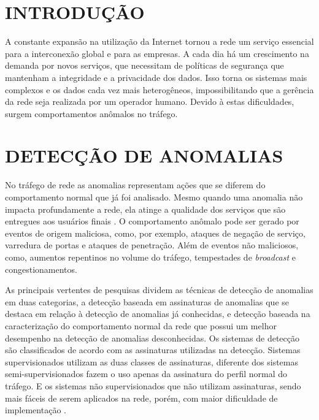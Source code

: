 \documentclass[article,12pt,oneside,a4paper,english,brazil]{unifil}
\begin{document}
\textual
\fontsize{12}{7}\selectfont
\begin{Spacing}{1.5}

\section*{INTRODUÇÃO}

A constante expansão na utilização da Internet tornou a rede um serviço essencial para a interconexão global e para as empresas. A cada dia há um crescimento na demanda por novos serviços, que necessitam de políticas de segurança que mantenham a integridade e a privacidade dos dados. Isso torna os sistemas mais complexos e os dados cada vez mais heterogêneos, impossibilitando que a gerência da rede seja realizada por um operador humano. Devido à estas dificuldades, surgem comportamentos anômalos no tráfego.

\section*{DETECÇÃO DE ANOMALIAS}

No tráfego de rede as anomalias representam ações que se diferem do comportamento normal que já foi analisado. Mesmo quando uma anomalia não impacta profundamente a rede, ela atinge a qualidade dos serviços que são entregues aos usuários finais \cite{Lakhina2004}. O comportamento anômalo pode ser gerado por eventos de origem maliciosa, como, por exemplo, ataques de negação de serviço, varredura de portas e ataques de penetração. Além de eventos não maliciosos, como, aumentos repentinos no volume do tráfego, tempestades de \textit{broadcast} e congestionamentos.

As principais vertentes de pesquisas dividem as técnicas de detecção de anomalias  em duas categorias, a detecção baseada em assinaturas de anomalias que se destaca em relação à detecção de anomalias já conhecidas, e detecção baseada na caracterização do comportamento normal da rede que possui um melhor desempenho na detecção de anomalias desconhecidas. Os sistemas de detecção são classificados de acordo com as assinaturas utilizadas na detecção. Sistemas supervisionados utilizam as duas classes de assinaturas, diferente dos sistemas semi-supervisionados fazem o uso apenas da assinatura do perfil normal do tráfego. E os sistemas não supervisionados que não utilizam assinaturas, sendo mais fáceis de serem aplicados na rede, porém, com maior dificuldade de implementação \cite{chandola2009}.


\end{Spacing}
\end{document}
